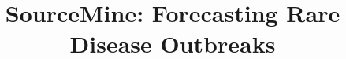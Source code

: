 \documentclass[conference]{IEEEtran}
\newcommand{\fullmodel}{{{\sf SourceMine}}\xspace}
\begin{document}

\title{\fullmodel: Forecasting Rare Disease Outbreaks}

\end{document}
